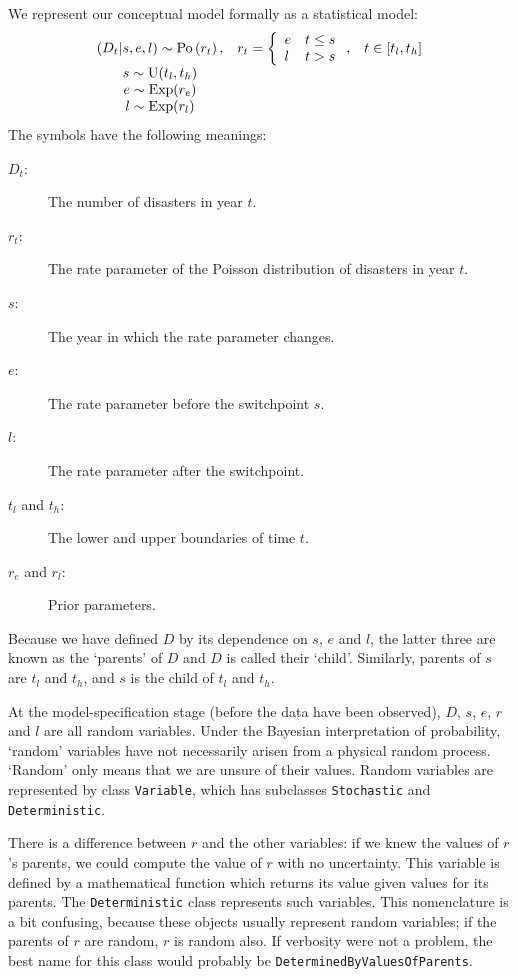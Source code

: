 We represent our conceptual model formally as a statistical model:
\begin{equation}
    \begin{array}{ccc}
        (D_t | s, e, l) \sim \textup{Po}\left(r_t\right), & r_t=\left\{\begin{array}{ll}
            e & t\le s\\ l & t>s
            \end{array}\right.,&t\in[t_l,t_h]\\
        s\sim \textup{U}(t_l, t_h)\\
        e\sim \textup{Exp}(r_e)\\
        l\sim \textup{Exp}(r_l)        
    \end{array}
    \label{disastermodel} 
\end{equation}
The symbols have the following meanings:
\begin{description}
    \item[$D_t$:] The number of disasters in year $t$.
    \item[$r_t$:] The rate parameter of the Poisson distribution of disasters in year $t$.
    \item[$s$:] The year in which the rate parameter changes.
    \item[$e$:] The rate parameter before the switchpoint $s$.
    \item[$l$:] The rate parameter after the switchpoint.
    \item[$t_l$ and $t_h$:] The lower and upper boundaries of time $t$.
    \item[$r_e$ and $r_l$:] Prior parameters.
\end{description}
Because we have defined $D$ by its dependence on $s$, $e$ and $l$, the latter three are known as the `parents' of $D$ and $D$ is called their `child'. Similarly, parents of $s$ are $t_l$ and $t_h$, and $s$ is the child of $t_l$ and $t_h$.

At the model-specification stage (before the data have been observed), $D$, $s$, $e$, $r$ and $l$ are all random variables. Under the Bayesian interpretation of probability, `random' variables have not necessarily arisen from a physical random process. `Random' only means that we are unsure of their values. Random variables are represented by class \texttt{Variable}, which has subclasses \texttt{Stochastic} and \texttt{Deterministic}.

There is a difference between $r$ and the other variables: if we knew the values of $r$'s parents, we could compute the value of $r$ with no uncertainty. This variable is defined by a mathematical function which returns its value given values for its parents. The \texttt{Deterministic} class represents such variables. This nomenclature is a bit confusing, because these objects usually represent random variables; if the parents of $r$ are random, $r$ is random also. If verbosity were not a problem, the best name for this class would probably be \texttt{DeterminedByValuesOfParents}.

